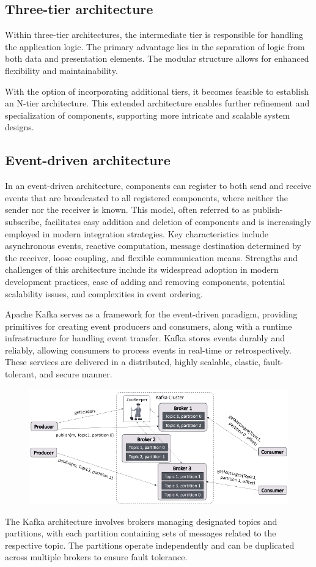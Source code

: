 \subsection*{Three-tier architecture}
Within three-tier architectures, the intermediate tier is responsible for handling the application logic. 
The primary advantage lies in the separation of logic from both data and presentation elements. 
The modular structure allows for enhanced flexibility and maintainability.

With the option of incorporating additional tiers, it becomes feasible to establish an N-tier architecture. 
This extended architecture enables further refinement and specialization of components, supporting more intricate and scalable system designs.

\subsection*{Event-driven architecture}
In an event-driven architecture, components can register to both send and receive events that are broadcasted to all registered components, where neither the sender nor the receiver is known.
This model, often referred to as publish-subscribe, facilitates easy addition and deletion of components and is increasingly employed in modern integration strategies.
Key characteristics include asynchronous events, reactive computation, message destination determined by the receiver, loose coupling, and flexible communication means.
Strengths and challenges of this architecture include its widespread adoption in modern development practices, ease of adding and removing components, potential scalability issues, and complexities in event ordering.

Apache Kafka serves as a framework for the event-driven paradigm, providing primitives for creating event producers and consumers, along with a runtime infrastructure for handling event transfer. 
Kafka stores events durably and reliably, allowing consumers to process events in real-time or retrospectively. 
These services are delivered in a distributed, highly scalable, elastic, fault-tolerant, and secure manner.
\begin{figure}[H]
    \centering
    \includegraphics[width=0.75\linewidth]{images/kafka.png}
\end{figure}
The Kafka architecture involves brokers managing designated topics and partitions, with each partition containing sets of messages related to the respective topic. 
The partitions operate independently and can be duplicated across multiple brokers to ensure fault tolerance.

